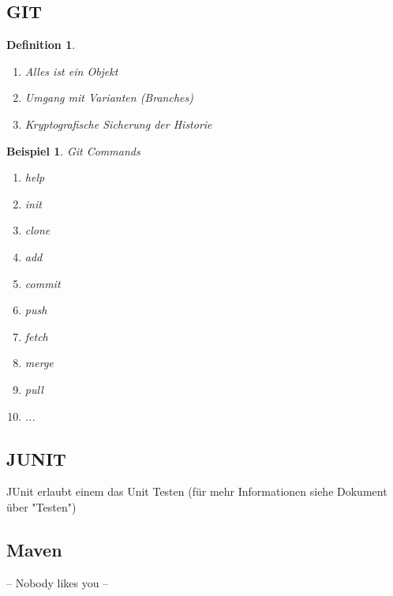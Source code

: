 \documentclass[a4paper]{article}
\theoremstyle{break}
\newtheorem{defi}{Definition}[section]
\newtheorem{ex}{Beispiel}[section]
\begin{document}
    \newpage
    \subsection{GIT}
    \begin {defi}
      \begin{enumerate}
        \item Alles ist ein Objekt
        \item Umgang mit Varianten (Branches)
        \item Kryptografische Sicherung der Historie
      \end {enumerate}
    \end {defi}

    \begin {ex}
      Git Commands
      \begin{enumerate}
      \item help
      \item init
      \item clone
      \item add
      \item commit
      \item push
      \item fetch
      \item merge
      \item pull
        \item ...
      \end{enumerate}
    \end {ex}

    \subsection {JUNIT}
		JUnit erlaubt einem das Unit Testen (für mehr Informationen siehe Dokument über "Testen")
     \subsection {Maven}
     -- Nobody likes you --



    
    
\end{document}
